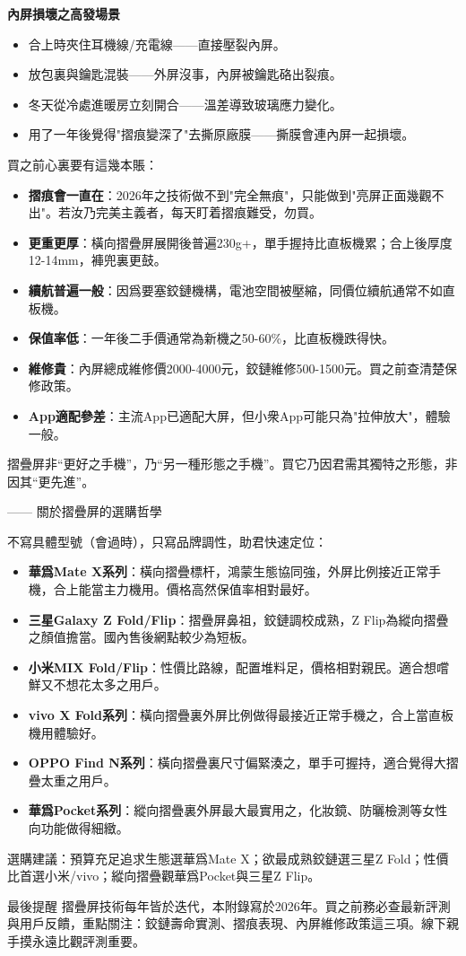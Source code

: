 \textbf{內屏損壞之高發場景}\par

\begin{itemize}
  \item 合上時夾住耳機線/充電線——直接壓裂內屏。
  \item 放包裏與鑰匙混裝——外屏沒事，內屏被鑰匙硌出裂痕。
  \item 冬天從冷處進暖房立刻開合——溫差導致玻璃應力變化。
  \item 用了一年後覺得"摺痕變深了"去撕原廠膜——撕膜會連內屏一起損壞。
\end{itemize}


買之前心裏要有這幾本賬：

\begin{itemize}
  \item \textbf{摺痕會一直在}：2026年之技術做不到"完全無痕"，只能做到"亮屏正面幾觀不出"。若汝乃完美主義者，每天盯着摺痕難受，勿買。
  \item \textbf{更重更厚}：橫向摺疊屏展開後普遍230g+，單手握持比直板機累；合上後厚度12-14mm，褲兜裏更鼓。
  \item \textbf{續航普遍一般}：因爲要塞鉸鏈機構，電池空間被壓縮，同價位續航通常不如直板機。
  \item \textbf{保值率低}：一年後二手價通常為新機之50-60\%，比直板機跌得快。
  \item \textbf{維修貴}：內屏總成維修價2000-4000元，鉸鏈維修500-1500元。買之前查清楚保修政策。
  \item \textbf{App適配參差}：主流App已適配大屏，但小衆App可能只為"拉伸放大"，體驗一般。
\end{itemize}

摺疊屏非“更好之手機”，乃“另一種形態之手機”。買它乃因君需其獨特之形態，非因其“更先進”。

—— 關於摺疊屏的選購哲學


不寫具體型號（會過時），只寫品牌調性，助君快速定位：

\begin{itemize}
  \item \textbf{華爲Mate X系列}：橫向摺疊標杆，鴻蒙生態協同強，外屏比例接近正常手機，合上能當主力機用。價格高然保值率相對最好。
  \item \textbf{三星Galaxy Z Fold/Flip}：摺疊屏鼻祖，鉸鏈調校成熟，Z Flip為縱向摺疊之顏值擔當。國內售後網點較少為短板。
  \item \textbf{小米MIX Fold/Flip}：性價比路線，配置堆料足，價格相對親民。適合想嚐鮮又不想花太多之用戶。
  \item \textbf{vivo X Fold系列}：橫向摺疊裏外屏比例做得最接近正常手機之，合上當直板機用體驗好。
  \item \textbf{OPPO Find N系列}：橫向摺疊裏尺寸偏緊湊之，單手可握持，適合覺得大摺疊太重之用戶。
  \item \textbf{華爲Pocket系列}：縱向摺疊裏外屏最大最實用之，化妝鏡、防曬檢測等女性向功能做得細緻。
\end{itemize}

選購建議：預算充足追求生態選華爲Mate X；欲最成熟鉸鏈選三星Z Fold；性價比首選小米/vivo；縱向摺疊觀華爲Pocket與三星Z Flip。

\begin{tcbinfo}{最後提醒}
摺疊屏技術每年皆於迭代，本附錄寫於2026年。買之前務必查最新評測與用戶反饋，重點關注：鉸鏈壽命實測、摺痕表現、內屏維修政策這三項。線下親手摸永遠比觀評測重要。

\end{tcbinfo}
